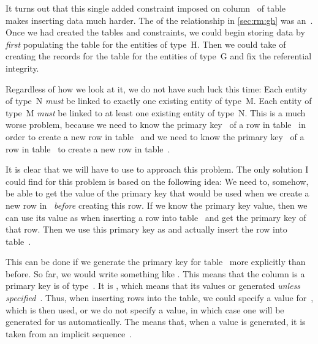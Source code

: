 It turns out that this single added  constraint imposed on column~ of table~ makes inserting data much harder.
The  of the relationship in \cref{sec:rm:gh} was an~.
Once we had created the tables and constraints, we could begin storing data by \emph{first} populating the table for the entities of type~H.
Then we could take of creating the records for the table for the entities of type~G and fix the referential integrity.

Regardless of how we look at it, we do not have such luck this time:
Each entity of type~N \emph{must} be linked to exactly one existing entity of type~M.
Each entity of type~M \emph{must} be linked to at least one existing entity of type~N.
This is a much worse problem, because we need to know the primary key~ of a row in table~ in order to create a new row in table~ and we need to know the primary key~ of a row in table~ to create a new row in table~.

It is clear that we will have to use  to approach this problem.
The only solution I could find for this problem is based on the following idea:
We need to, somehow, be able to get the value of the primary key that would be used when we create a new row in~ \emph{before} creating this row.
If we know the primary key value, then we can use its value as  when inserting a row into table~ and get the primary key of that row.
Then we use this primary key as  and actually insert the row into table~.

This can be done if we generate the primary key for table~ more explicitly than before.
So far, we would write something like .
This means that the column is a primary key is of type~.
It is , which means that its values or generated \emph{unless specified}~\cite{PGDG:PD:GC}.
Thus, when inserting rows into the table, we could specify a value for~, which is then used, or we do not specify a value, in which case one will be generated for us automatically.
The  means that, when a value is generated, it is taken from an implicit sequence~\cite{PGDG:PD:IC}.

